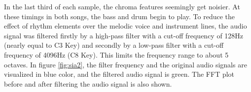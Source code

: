 In the last third of each sample, the chroma features seemingly get noisier. At these timings in both songs, the bass and drum begin to play. To reduce the effect of rhythm elements over the melodic voice and instrument lines, the audio signal was filtered firstly by a high-pass filter with a cut-off frequency of 128Hz (nearly equal to C3 Key) and secondly by a low-pass filter with a cut-off frequency of 4096Hz (C8 Key). This limits the frequency range to about 5 octaves. 
In figure \ref{fig:sia2}, the filter frequency and the original audio signals are visualized in blue color, and the filtered audio signal is green. The FFT plot before and after filtering the audio signal is also shown. 
\begin{figure}[htbp]
	\centering
\end{figure}
